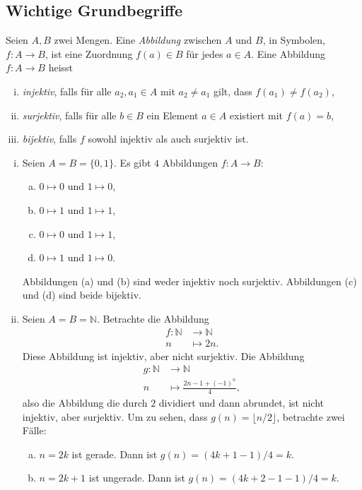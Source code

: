 \documentclass[../main.tex]{subfiles}
\begin{document}
\subsection*{Wichtige Grundbegriffe}
\begin{definition}
  Seien $A, B$ zwei Mengen.
  Eine \emph{Abbildung} zwischen $A$ und $B$,
  in Symbolen, $f \colon A \to B$, ist eine Zuordnung
  $f(a) \in B$ für jedes $a \in A$.
  Eine Abbildung $f \colon A \to B$ heisst
  \begin{enumerate}[(i)]
    \item \emph{injektiv}, falls für alle $a_{2}, a_{1} \in A$
      mit $a_{2} \ne a_{1}$ gilt, dass $f(a_{1}) \neq f(a_{2})$,
    \item \emph{surjektiv}, falls für alle $b \in B$ ein Element
      $a \in A$ existiert mit $f(a) = b$,
      \item \emph{bijektiv}, falls $f$ sowohl injektiv als auch surjektiv ist.
  \end{enumerate}
\end{definition}

\begin{examples}\label{ex:inj-surj}
  \leavevmode
  \begin{enumerate}[(i)]
    \item Seien $A = B = \{0, 1\}$. Es gibt $4$ Abbildungen $f \colon A \rightarrow B$:
      \begin{enumerate}[(a)]
        \item $0 \mapsto 0$ und $1 \mapsto 0$,
        \item $0 \mapsto 1$ und $1 \mapsto 1$,
        \item $0 \mapsto 0$ und $1 \mapsto 1$,
        \item $0 \mapsto 1$ und $1 \mapsto 0$.
      \end{enumerate}
      Abbildungen (a) und (b) sind weder injektiv noch surjektiv. Abbildungen (c) und (d) sind
      beide bijektiv.
    \item Seien $A = B = \mathbb N$. Betrachte die Abbildung
      \begin{align*}
        f \colon \mathbb N &\to \mathbb N \\
        n &\mapsto 2n.
      \end{align*}
      Diese Abbildung ist injektiv, aber nicht surjektiv. Die Abbildung
      \begin{align*}
        g \colon \mathbb N &\to \mathbb N \\
            n &\mapsto \frac{2n - 1 + {(-1)}^{n}}{4},
      \end{align*}
      also die Abbildung die durch $2$ dividiert und dann abrundet, ist nicht injektiv,
      aber surjektiv. Um zu sehen, dass
      $g(n) = \lfloor{n/2}\rfloor$, betrachte zwei Fälle:
      \begin{enumerate}[(a)]
        \item $n = 2k$ ist gerade. Dann ist $g(n) = (4k+1-1)/4 = k$.
        \item $n = 2k + 1$ ist ungerade. Dann ist $g(n) = (4k + 2 -1 -1)/4 = k$.
      \end{enumerate}
  \end{enumerate}
\end{examples}
\end{document}
